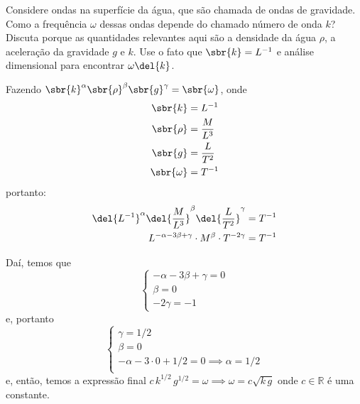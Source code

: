 \documentclass[]{IMTexam}
\begin{document}
\begin{questions}
	\question
	Considere ondas na superfície da água, que são chamada de ondas de gravidade.
	Como a frequência $ \omega $ dessas ondas depende do chamado número de onda $ k $?
	Discuta porque as quantidades relevantes aqui são a densidade da água $ \rho $, a aceleração da gravidade $ g $ e $ k $.
	Use o fato que $ \sbr{k}=L^{-1} $ e análise dimensional para encontrar $ \omega\del{k} $.

	\begin{solution}

		\begin{multi}
			Fazendo $ \sbr{k}^{\alpha} \sbr{\rho}^{\beta} \sbr{g}^{\gamma}=\sbr{\omega} $, onde
			\begin{align*}
				\sbr{k}      & =L^{-1}           \\
				\sbr{\rho}   & =\dfrac{M}{L^{3}} \\
				\sbr{g}      & =\dfrac{L}{T^{2}} \\
				\sbr{\omega} & =T^{-1}
			\end{align*}
			portanto: \begin{align*}
				\del{L^{-1}}^{\alpha}\del{\dfrac{M}{L^{3}}}^{\beta}\del{\dfrac{L}{T^{2}}}^{\gamma} & =T^{-1} \\
				L^{-\alpha-3\beta+\gamma}\cdot M^{\beta}\cdot T^{-2\gamma}                         & =T^{-1}
			\end{align*}

			\nextcol

			Daí, temos que
			\[ \begin{cases}
					-\alpha-3\beta+\gamma=0 \\
					\beta=0                 \\
					-2\gamma=-1
				\end{cases} \]
			e, portanto
			\[ \begin{cases}
					\gamma=1/2                              \\
					\beta=0                                 \\
					-\alpha-3\cdot0+1/2=0\implies\alpha=1/2 \\
				\end{cases} \]
			e, então, temos a expressão final $ c\,k^{1/2}\,g^{1/2}=\omega\implies \omega=c\sqrt{k\,g} $ onde $ c\in\mathbb{R} $ é uma constante.
		\end{multi}

	\end{solution}

	\question


\end{questions}
\end{document}
